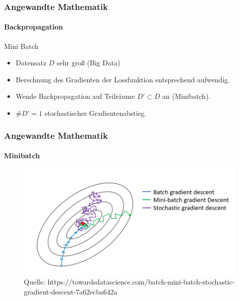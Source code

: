 \documentclass{beamer}
\begin{document}
\begin{frame}
    \frametitle{Angewandte Mathematik}
\framesubtitle{Backpropagation}
    \begin{block}{Mini Batch}
\begin{itemize}
\item   Datensatz $D$ sehr groß (Big Data)
\item \pause Berechnung des Gradienten der Lossfunktion entsprechend aufwendig. 
\item \pause Wende Backpropagation auf Teilräume $D' \subset D$ an (Minibatch).
\item \pause $\#D' = 1$ stochastischer Gradientenabstieg.
\end{itemize}

\end{block}
 \end{frame}



\begin{frame}
    \frametitle{Angewandte Mathematik}
\framesubtitle{Minibatch}
\begin{figure}[H]
      \centering
    \includegraphics[width=1.0\textwidth]{images/batchgradient}
      \caption{Quelle: https://towardsdatascience.com/batch-mini-batch-stochastic-gradient-descent-7a62ecba642a}
\end{figure}

 \end{frame}
\end{document}
